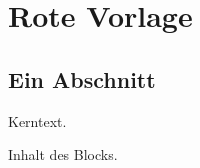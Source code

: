 \chapter{Rote Vorlage}\label{c98}

\section{Ein Abschnitt}\label{c98.s1}

Kerntext.

\begin{vertiefung}[id=c98.v1, titel={Titel}, wozu={Wozu.}, voraussetzung={Nichts.}, zurueck={Zurück.}]
Inhalt des Blocks.
\end{vertiefung}
